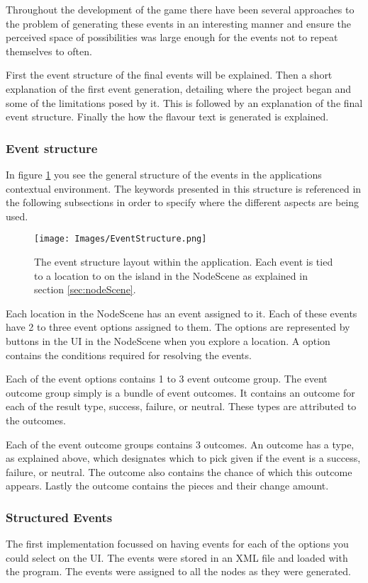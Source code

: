 Throughout the development of the game there have been several approaches to the problem of generating these events in an interesting manner and ensure the perceived space of possibilities was large enough for the events not to repeat themselves to often.

First the event structure of the final events will be explained. Then a short explanation of the first event generation, detailing where the project began and some of the limitations posed by it. This is followed by an explanation of the final event structure. Finally the how the flavour text is generated is explained.

\subsubsection{Event structure}
In figure \ref{fig:eStruc} you see the general structure of the events in the applications contextual environment. The keywords presented in this structure is referenced in the following subsections in order to specify where the different aspects are being used.

\begin{figure}[h]
    \centering
    \texttt{[image: Images/EventStructure.png]}
    \caption{The event structure layout within the application. Each event is tied to a location to on the island in the NodeScene as explained in section \ref{sec:nodeScene}.}
    \label{fig:eStruc}
\end{figure}

Each location in the NodeScene has an event assigned to it. 
Each of these events have 2 to three event options assigned to them. The options are represented by buttons in the UI in the NodeScene when you explore a location. A option contains the conditions required for resolving the events. 

Each of the event options contains 1 to 3 event outcome group. The event outcome group simply is a bundle of event outcomes. It contains an outcome for each of the result type, success, failure, or neutral. These types are attributed to the outcomes.

Each of the event outcome groups contains 3 outcomes. An outcome has a type, as explained above, which designates which to pick given if the event is a success, failure, or neutral. The outcome also contains the chance of which this outcome appears. Lastly the outcome contains the pieces and their change amount. 

\subsubsection{Structured Events}
The first implementation focussed on having events for each of the options you could select on the UI. The events were stored in an XML file and loaded with the program. The events were assigned to all the nodes as they were generated.

